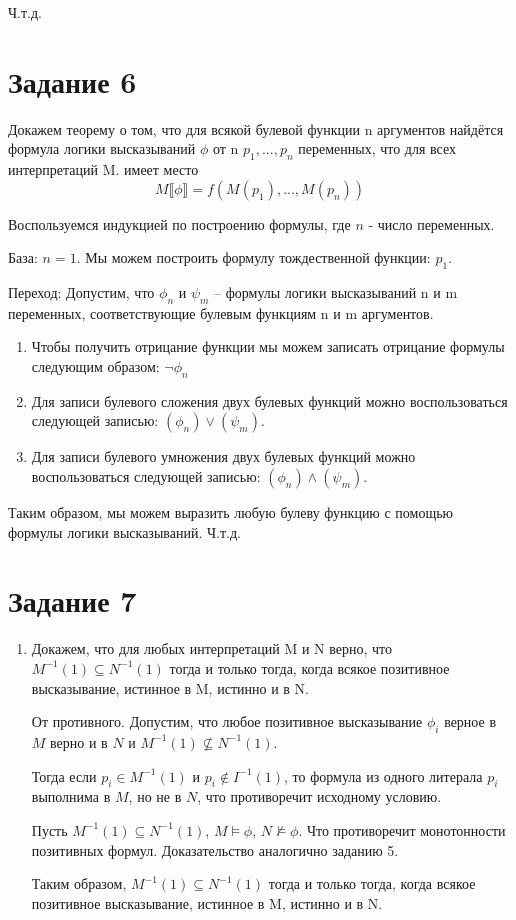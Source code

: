 \documentclass{article}
\begin{document}
Ч.т.д.

\section*{Задание 6}
Докажем теорему о том, что для всякой булевой функции n аргументов 
найдётся формула логики высказываний \(\phi\) от n \(p_1,...,p_n\) переменных, что для всех интерпретаций M.
имеет место
\[M \llbracket \phi \rrbracket = f(M(p_1), ..., M(p_n))\]

Воспользуемся индукцией по построению формулы, где \(n\) - число переменных.

База: \(n = 1\).
Мы можем построить формулу тождественной функции: \(p_1\).

Переход: 
Допустим, что \(\phi_n\) и \(\psi_m\) -- формулы логики высказываний n и m переменных, 
соответствующие булевым функциям n и m аргументов.

\begin{enumerate}
    \item 
        Чтобы получить отрицание функции мы можем записать 
        отрицание формулы следующим образом: \(\neg \phi_n\)
    \item 
        Для записи булевого сложения двух булевых функций можно воспользоваться
        следующей записью: \((\phi_n) \lor (\psi_m)\).
    \item 
        Для записи булевого умножения двух булевых функций можно воспользоваться
        следующей записью: \((\phi_n) \land (\psi_m)\).
\end{enumerate}

Таким образом, мы можем выразить любую булеву функцию 
с помощью формулы логики высказываний. Ч.т.д.
\section*{Задание 7}
\begin{enumerate}
    \item
    Докажем, что для любых интерпретаций M и N верно, что \(M^{-1}(1) \subseteq N^{-1}(1)\)
    тогда и только тогда, когда всякое позитивное высказывание, истинное в M, истинно и в N.

    От противного. Допустим, что любое позитивное высказывание \(\phi_i\) верное в 
    \(M\) верно и в \(N\) и \(M^{-1}(1) \nsubseteq N^{-1}(1)\).

    Тогда если \(p_i \in M^{-1}(1)\) и \(p_i \notin I^{-1}(1)\), то формула из одного литерала \(p_i\) 
    выполнима в \(M\), но не в \(N\), что противоречит исходному условию.

    Пусть \(M^{-1}(1) \subseteq N^{-1}(1)\), \(M \models \phi\), \(N \nvDash \phi\). 
    Что противоречит монотонности позитивных формул. Доказательство аналогично заданию 5.

    Таким образом, \(M^{-1}(1) \subseteq N^{-1}(1)\) тогда и только тогда, 
    когда всякое позитивное высказывание, истинное в M, истинно и в N.    
\end{enumerate}
\end{document}
